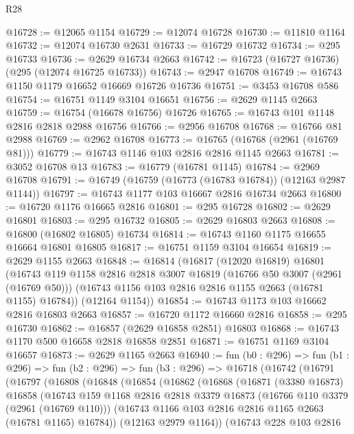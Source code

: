 \begin{lexlean}{R28}
\begin{coremodule}
@16728 := @12065 @1154
@16729 := @12074 @16728
@16730 := @11810 @1164
@16732 := @12074 @16730 @2631
@16733 := @16729 @16732
@16734 := @295 @16733
@16736 := @2629 @16734 @2663
@16742 := @16723 (@16727 @16736) (@295 (@12074 @16725 @16733))
@16743 := @2947 @16708
@16749 := @16743 @1150 @1179 @16652 @16669 @16726 @16736
@16751 := @3453 @16708 @586
@16754 := @16751 @1149 @3104 @16651
@16756 := @2629 @1145 @2663
@16759 := @16754 (@16678 @16756) @16726
@16765 := @16743 @101 @1148 @2816 @2818 @2988 @16756
@16766 := @2956 @16708
@16768 := @16766 @81 @2988
@16769 := @2962 @16708
@16773 := @16765 (@16768 (@2961 (@16769 @81)))
@16779 := @16743 @1146 @103 @2816 @2816 @1145 @2663
@16781 := @3052 @16708 @13
@16783 := @16779 (@16781 @1145)
@16784 := @2969 @16708
@16791 := @16749 (@16759 (@16773 (@16783 @16784)) (@12163 @2987 @1144))
@16797 := @16743 @1177 @103 @16667 @2816 @16734 @2663
@16800 := @16720 @1176 @16665 @2816
@16801 := @295 @16728
@16802 := @2629 @16801
@16803 := @295 @16732
@16805 := @2629 @16803 @2663
@16808 := @16800 (@16802 @16805) @16734
@16814 := @16743 @1160 @1175 @16655 @16664 @16801 @16805
@16817 := @16751 @1159 @3104 @16654
@16819 := @2629 @1155 @2663
@16848 := @16814
    (@16817
      (@12020 @16819)
      @16801
      (@16743
        @119
        @1158
        @2816
        @2818
        @3007
        @16819
        (@16766 @50 @3007 (@2961 (@16769 @50)))
        (@16743 @1156 @103 @2816 @2816 @1155 @2663 (@16781 @1155) @16784))
      (@12164 @1154))
@16854 := @16743 @1173 @103 @16662 @2816 @16803 @2663
@16857 := @16720 @1172 @16660 @2816
@16858 := @295 @16730
@16862 := @16857 (@2629 @16858 @2851) @16803
@16868 := @16743 @1170 @500 @16658 @2818 @16858 @2851
@16871 := @16751 @1169 @3104 @16657
@16873 := @2629 @1165 @2663
@16940 := fun (b0 : @296) =>
  fun (b1 : @296) =>
  fun (b2 : @296) =>
  fun (b3 : @296) =>
  @16718
    (@16742
      (@16791
        (@16797
          (@16808
            (@16848
              (@16854
                (@16862
                  (@16868
                    (@16871
                      (@3380 @16873)
                      @16858
                      (@16743
                        @159
                        @1168
                        @2816
                        @2818
                        @3379
                        @16873
                        (@16766 @110 @3379 (@2961 (@16769 @110)))
                        (@16743 @1166 @103 @2816 @2816 @1165 @2663 (@16781 @1165) @16784))
                      (@12163 @2979 @1164))
                    (@16743
                      @228
                      @103
                      @2816

\end{coremodule}
\end{lexlean}
